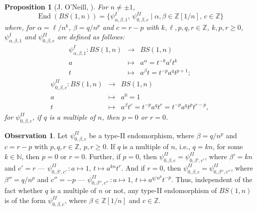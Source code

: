 \documentclass[a4paper]{amsart}
\newtheorem{prop}[thm]{Proposition}
\theoremstyle{definition}
\newtheorem{obs}[thm]{Observation}
\newcommand\ZZ{\mathbb{Z}}
\newcommand\NN{\mathbb{N}}
\newcommand{\End}{\operatorname{End}}
\begin{document}
\begin{prop}[J. O'Neill, {\cite[Proposition 2.1]{N}}]\label{prop: O'Neil}
For $n\neq \pm 1$,
 $$
\End(BS(1,n))=\{\psi^{I}_{\alpha, \beta, 1},\, \psi^{II}_{0, \beta, c} \mid \alpha, \beta\in \ZZ[1/n],\, c \in \ZZ\}
 $$
where, for $\alpha=\ell/n^k$, $\beta=q/n^p$ and $c = r -p$ with $k,\ell, p,q, r\in \ZZ$, $k, p, r\geq 0$, $\psi^{I}_{\alpha, \beta, 1}$ and $\psi^{II}_{0, \beta, c}$ are defined as follows:
%
\begin{equation}\label{eq: endos I}
\begin{array}{rcl} \psi^{I}_{\alpha, \beta, 1}\colon BS(1,n) & \to & BS(1,n) \\ a & \mapsto & a^{\alpha}=t^{-k} a^{\ell} t^k \\ t & \mapsto & a^{\beta}t=t^{-p}a^{q} t^{p+1};
 \end{array}
 \end{equation}
%
\begin{equation}\label{eq: endos II}
\begin{array}{rcl} \psi^{II}_{0, \beta, c}\colon BS(1,n) & \to & BS(1,n) \\ a & \mapsto & a^{0}=1 \\ t & \mapsto & a^{\beta}t^c=t^{-p}a^{q} t^{r} = t^{-p}a^{q}t^pt^{r-p},
 \end{array}
 \end{equation}
for  $\psi^{II}_{0, \beta, c}$, if $q$ is a multiple of $n$, then $p=0$ or $r=0$.
\end{prop}

\begin{obs}
   Let $\psi^{II}_{0, \beta, c}$ be a type-II endomorphism, where $\beta = q/n^p$ and $c = r -p$ with $p,q, r\in \ZZ$, $p, r\geq 0$. If $q$ is a multiple of $n$, i.e., $q = kn$, for some $k \in \NN$, then $p=0$ or $r=0$. Further, if $p=0$, then $\psi^{II}_{0, \beta, c} = \psi^{II}_{0, \beta', c'}$, where $\beta' = kn$ and $c' =r$ --- $\psi^{II}_{0, \beta', c'} \, \colon a \mapsto 1, \, t \mapsto a^{kn}t^r$. And if $r=0$, then $\psi^{II}_{0, \beta, c} = \psi^{II}_{0, \beta'', c''}$, where $\beta'' = q/n^p$ and $c'' =-p$ --- $\psi^{II}_{0, \beta'', c''} \, \colon a \mapsto 1, \, t \mapsto a^{q/n^p} t^{-p}$. Thus, independent of the fact whether $q$ is a multiple of $n$ or not, any type-II endomorphism of $BS(1,n)$ is of the form $\psi^{II}_{0, \beta, c}$, where $\beta \in \ZZ[1/n]$ and $c \in \ZZ$.
\end{obs}
\end{document}
